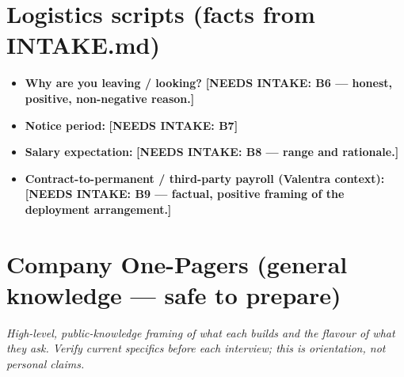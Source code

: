 \section{Logistics scripts (facts from INTAKE.md)}
\begin{itemize}
\item \textbf{Why are you leaving / looking?}
  \textbf{[NEEDS INTAKE: B6 --- honest, positive, non-negative reason.]}
\item \textbf{Notice period:} \textbf{[NEEDS INTAKE: B7]}
\item \textbf{Salary expectation:} \textbf{[NEEDS INTAKE: B8 --- range and
  rationale.]}
\item \textbf{Contract-to-permanent / third-party payroll (Valentra context):}
  \textbf{[NEEDS INTAKE: B9 --- factual, positive framing of the deployment
  arrangement.]}
\end{itemize}

\section{Company One-Pagers (general knowledge --- safe to prepare)}
\emph{High-level, public-knowledge framing of what each builds and the flavour
of what they ask. Verify current specifics before each interview; this is
orientation, not personal claims.}

